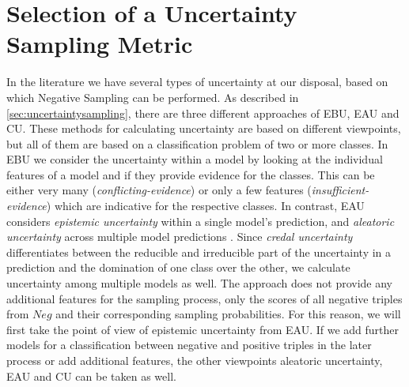 \section{Selection of a Uncertainty Sampling Metric} 
\label{sec:selection_of_a_uncertainty_sampling_metric}
In the literature we have several types of uncertainty at our disposal, based on which Negative Sampling can be performed.
As described in \autoref{sec:uncertaintysampling}, there are three different approaches of \ac{EBU}, \ac{EAU} and \ac{CU}.
These methods for calculating uncertainty are based on different viewpoints, but all of them are based on a classification problem of two or more classes.
In \ac{EBU} we consider the uncertainty within a model by looking at the individual features of a model and if they provide evidence for the classes.
This can be either very many (\textit{conflicting-evidence}) or only a few features (\textit{insufficient-evidence}) which are indicative for the respective classes.
In contrast, \ac{EAU} considers \textit{epistemic uncertainty} within a single model’s prediction, and \textit{aleatoric uncertainty} across multiple model predictions \cite{human-in-the-loop}.
Since \textit{credal uncertainty} differentiates between the reducible and irreducible part of the uncertainty in a prediction and the domination of one class over the other, we calculate uncertainty among multiple models as well.
The \kbgan approach does not provide any additional features for the sampling process, only the scores of all negative triples from $Neg$ and their corresponding sampling probabilities.
For this reason, we will first take the point of view of epistemic uncertainty from \ac{EAU}.
If we add further models for a classification between negative and positive triples in the later process or add additional features, the other viewpoints aleatoric uncertainty, \ac{EAU} and \ac{CU} can be taken as well.
